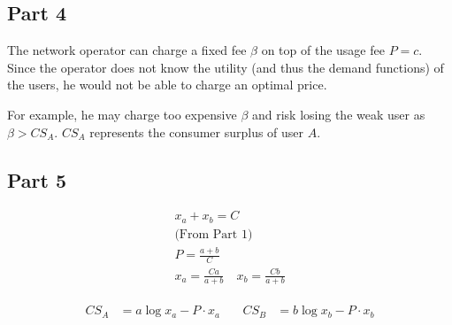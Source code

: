 \documentclass[]{article}
\newcommand{\e}{&=}
\begin{document}
\subsection*{Part 4}

The network operator can charge a fixed fee $\beta$ on top of the usage fee $P = c$. Since the operator does not know the utility (and thus the demand functions) of the users, he would not be able to charge an optimal price.

For example, he may charge too expensive $\beta$ and risk losing the weak user as $\beta > CS_A$. $CS_A$ represents the consumer surplus of user $A$.

\subsection*{Part 5}

\begin{gather*}
x_a + x_b = C \\
\text{(From Part 1)} \\
P = \frac{a + b}{C} \\
x_a = \frac{Ca}{a + b} \quad x_b = \frac{Cb}{a + b}
\end{gather*}

\begin{align*}
\begin{split}
CS_A \e a \log x_a - P \cdot x_a \\
\end{split}
&\ 
\begin{split}
CS_B \e b \log x_b - P \cdot x_b \\
\end{split}
\end{align*}
\end{document}

